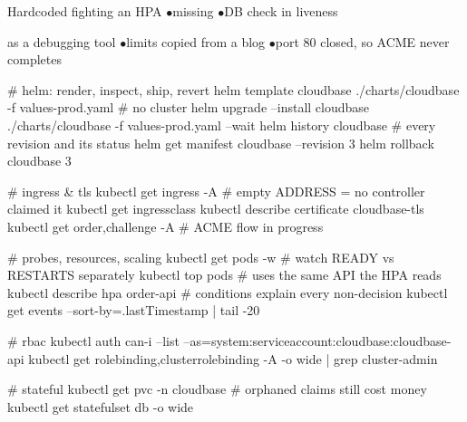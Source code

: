\begin{wbitem}
  \item Hardcoded  fighting an HPA \quad$\bullet$\quad missing  \quad$\bullet$\quad DB check in liveness
  \item {} as a debugging tool \quad$\bullet$\quad limits copied from a blog \quad$\bullet$\quad port 80 closed, so ACME never completes
\end{wbitem}

\begin{cheatsheet}
\end{cheatsheet}

\begin{bashbox}
# helm: render, inspect, ship, revert
helm template cloudbase ./charts/cloudbase -f values-prod.yaml   # no cluster
helm upgrade --install cloudbase ./charts/cloudbase -f values-prod.yaml --wait
helm history cloudbase                  # every revision and its status
helm get manifest cloudbase --revision 3
helm rollback cloudbase 3

# ingress & tls
kubectl get ingress -A                  # empty ADDRESS = no controller claimed it
kubectl get ingressclass
kubectl describe certificate cloudbase-tls
kubectl get order,challenge -A          # ACME flow in progress

# probes, resources, scaling
kubectl get pods -w                     # watch READY vs RESTARTS separately
kubectl top pods                        # uses the same API the HPA reads
kubectl describe hpa order-api          # conditions explain every non-decision
kubectl get events --sort-by=.lastTimestamp | tail -20

# rbac
kubectl auth can-i --list --as=system:serviceaccount:cloudbase:cloudbase-api
kubectl get rolebinding,clusterrolebinding -A -o wide | grep cluster-admin

# stateful
kubectl get pvc -n cloudbase            # orphaned claims still cost money
kubectl get statefulset db -o wide
\end{bashbox}

